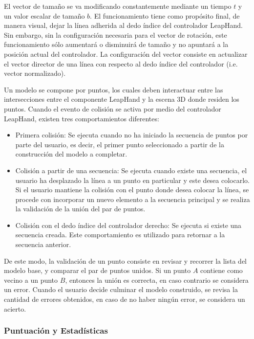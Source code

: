 \documentclass[conference]{IEEEtran}
\begin{document}
El vector de tamaño se va modificando constantemente mediante un tiempo $t$ y un valor escalar de tamaño $b$. El funcionamiento tiene como propósito final, de manera visual, dejar la línea adherida al dedo índice del controlador LeapHand. Sin embargo, sin la configuración necesaria para el vector de rotación, este funcionamiento sólo aumentará o disminuirá de tamaño y no apuntará a la posición actual del controlador. La configuración del vector consiste en actualizar el vector director de una línea con respecto al dedo índice del controlador (i.e. vector normalizado).

Un modelo se compone por puntos, los cuales deben interactuar entre las intersecciones entre el componente LeapHand y la escena 3D donde residen los puntos. Cuando el evento de colisión se activa por medio del controlador LeapHand, existen tres comportamientos diferentes:

\begin{itemize}
\item Primera colisión: Se ejecuta cuando no ha iniciado la secuencia de puntos por parte del usuario, es decir, el primer punto seleccionado a partir de la construcción del modelo a completar.
\item Colisión a partir de una secuencia: Se ejecuta cuando existe una secuencia, el usuario ha desplazado la línea a un punto en particular y este desea colocarlo. Si el usuario mantiene la colisión con el punto donde desea colocar la línea, se procede con incorporar un nuevo elemento a la secuencia principal y se realiza la validación de la unión del par de puntos.
\item Colisión con el dedo índice del controlador derecho: Se ejecuta si existe una secuencia creada. Este comportamiento es utilizado para retornar a la secuencia anterior.
\end{itemize}

De este modo, la validación de un punto consiste en revisar y recorrer la lista del modelo base, y comparar el par de puntos unidos. Si un punto $A$ contiene como vecino a un punto $B$, entonces la unión es correcta, en caso contrario se considera un error. Cuando el usuario decide culminar el modelo construido, se revisa la cantidad de errores obtenidos, en caso de no haber ningún error, se considera un acierto.

\subsubsection*{Puntuación y Estadísticas}
\end{document}

